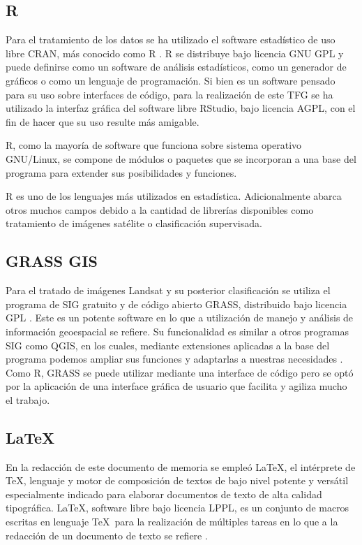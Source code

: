 \subsection{R}
Para el tratamiento de los datos se ha utilizado el software estadístico de uso libre CRAN, más conocido como R \citep{R2013}. R se distribuye bajo licencia GNU GPL y puede definirse como un software de análisis estadísticos, como un generador de gráficos o como un lenguaje de programación. Si bien es un software pensado para su uso sobre interfaces de código, para la realización de este \ac{TFG} se ha utilizado la interfaz gráfica del software libre RStudio, bajo licencia AGPL, con el fin de hacer que su uso resulte más amigable.\Sep

R, como la mayoría de software que funciona sobre sistema operativo GNU/Linux, se compone de módulos o paquetes que se incorporan a una base del programa para extender sus posibilidades y funciones.\Sep

R es uno de los lenguajes más utilizados en estadística. Adicionalmente abarca otros muchos campos debido a la cantidad de librerías disponibles como tratamiento de imágenes satélite o clasificación supervisada.

\subsection{GRASS GIS}
Para el tratado de imágenes Landsat y su posterior clasificación se utiliza el programa de \ac{SIG} gratuito y de código abierto \ac{GRASS}, distribuido bajo licencia GPL \citep{GRASS_GIS_software}. Este es un potente software en lo que a utilización de manejo y análisis de información geoespacial se refiere. Su funcionalidad es similar a otros programas \ac{SIG} como QGIS, en los cuales, mediante extensiones aplicadas a la base del programa podemos ampliar sus funciones y adaptarlas a nuestras necesidades \citep{neteler2002open}. Como R, \ac{GRASS} se puede utilizar mediante una interface de código pero se optó por la aplicación de una interface gráfica de usuario que facilita y agiliza mucho el trabajo.\Sep

\subsection{\LaTeX}
En la redacción de este documento de memoria se empleó \LaTeX, el intérprete de \TeX, lenguaje y motor de composición de textos de bajo nivel potente y versátil especialmente indicado para elaborar documentos de texto de alta calidad tipográfica. \LaTeX, software libre bajo licencia LPPL, es un conjunto de macros escritas en lenguaje \TeX\ para la realización de múltiples tareas en lo que a la redacción de un documento de texto se refiere \citep{Latex2011} \citep{galindo2001} \citep{lamport1994}.\Sep

